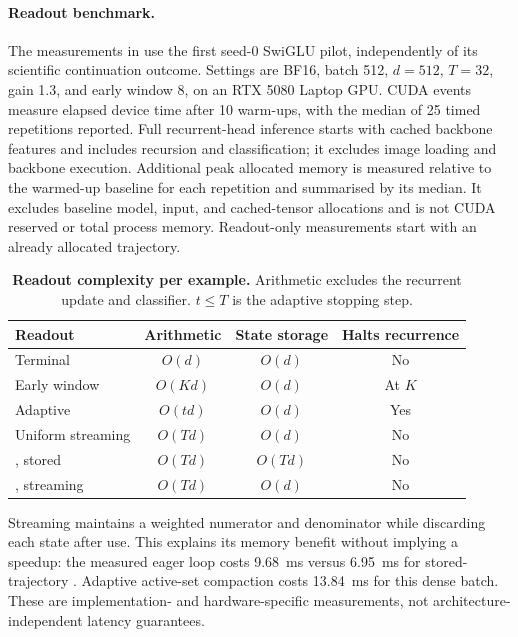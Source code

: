 \paragraph{Readout benchmark.}
The measurements in  use the first seed-0 SwiGLU pilot,
independently of its scientific continuation outcome. Settings are BF16,
batch 512, $d=512$, $T=32$, gain 1.3, and early window 8, on an RTX 5080
Laptop GPU. CUDA events measure elapsed device time after 10 warm-ups,
with the median of 25 timed repetitions reported. Full recurrent-head
inference starts with cached backbone features and includes recursion and
classification; it excludes image loading and backbone execution. Additional
peak allocated memory is measured relative to the warmed-up baseline for
each repetition and summarised by its median. It excludes baseline model,
input, and cached-tensor allocations and is not CUDA reserved or total process
memory. Readout-only measurements start with an already allocated trajectory.



\begin{table}[htbp]
\centering
\caption{\textbf{Readout complexity per example.} Arithmetic excludes the
recurrent update and classifier. $t\leq T$ is the adaptive stopping step.}
\label{tab:readout_complexity}
\small
\begin{tabular}{lccc}
\toprule
Readout & Arithmetic & State storage & Halts recurrence \\
\midrule
Terminal & $O(d)$ & $O(d)$ & No \\
Early window & $O(Kd)$ & $O(d)$ & At $K$ \\
Adaptive & $O(td)$ & $O(d)$ & Yes \\
Uniform streaming & $O(Td)$ & $O(d)$ & No \\
\grace{}, stored & $O(Td)$ & $O(Td)$ & No \\
\grace{}, streaming & $O(Td)$ & $O(d)$ & No \\
\bottomrule
\end{tabular}
\end{table}

Streaming \grace{} maintains a weighted numerator and denominator while
discarding each state after use. This explains its memory benefit without
implying a speedup: the measured eager loop costs 9.68~ms versus 6.95~ms
for stored-trajectory \grace{}. Adaptive active-set compaction costs 13.84~ms
for this dense batch. These are implementation- and hardware-specific
measurements, not architecture-independent latency guarantees.

